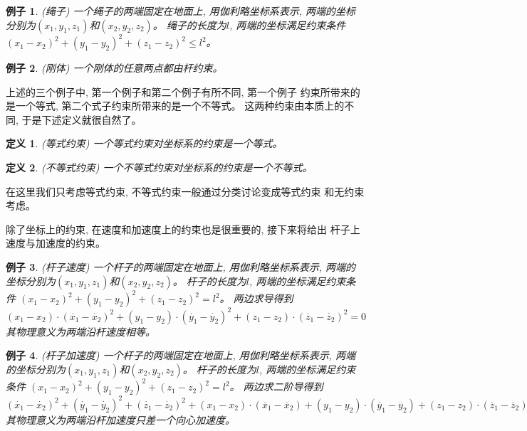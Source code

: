 \documentclass{ctexart}
\numberwithin{equation}{subsection}
\numberwithin{theorem}{subsection}
\newtheorem{definition} {定义}
\numberwithin{definition}{subsection}
\numberwithin{proof}{subsection}
\numberwithin{lemma}{subsection}
\newtheorem{example}    {例子}
\numberwithin{example}{subsection}
\numberwithin{remark}{subsection}
\numberwithin{corollary}{subsection}
\numberwithin{exercise}{subsection}
\numberwithin{problem}{subsection}
\numberwithin{question}{section}
\numberwithin{method}{subsection}
\begin{document}
    \begin{example}
        \label{1.4 ex:rope}
        (绳子) 一个绳子的两端固定在地面上, 用伽利略坐标系表示,
        两端的坐标分别为\((x_1, y_1, z_1)\)和\((x_2, y_2, z_2)\)。
        绳子的长度为\(l\), 两端的坐标满足约束条件
        \((x_1 - x_2)^2 + (y_1 - y_2)^2 + (z_1 - z_2)^2 \leq l^2\)。
    \end{example}

    \begin{example}
        \label{1.4 ex:rigid body}
        (刚体) 一个刚体的任意两点都由杆约束。
    \end{example}

    上述的三个例子中, 第一个例子和第二个例子有所不同, 第一个例子
    约束所带来的是一个等式, 第二个式子约束所带来的是一个不等式。
    这两种约束由本质上的不同, 于是下述定义就很自然了。

    \begin{definition}
        \label{1.4 def:equation constraint}
        (等式约束) 一个等式约束对坐标系的约束是一个等式。
    \end{definition}

    \begin{definition}
        \label{1.4 def:inequality constraint}
        (不等式约束) 一个不等式约束对坐标系的约束是一个不等式。
    \end{definition}

    在这里我们只考虑等式约束, 不等式约束一般通过分类讨论变成等式约束
    和无约束考虑。

    除了坐标上的约束, 在速度和加速度上的约束也是很重要的, 接下来将给出
    杆子上速度与加速度的约束。

    \begin{example}
        \label{1.4 ex:stick velocity}
        (杆子速度) 一个杆子的两端固定在地面上, 用伽利略坐标系表示,
        两端的坐标分别为\((x_1, y_1, z_1)\)和\((x_2, y_2, z_2)\)。
        杆子的长度为\(l\), 两端的坐标满足约束条件
        \((x_1 - x_2)^2 + (y_1 - y_2)^2 + (z_1 - z_2)^2 = l^2\)。
        两边求导得到
        \((x_1 - x_2) \cdot (\dot{x_1} - \dot{x_2})^2 + 
        (y_1 - y_2) \cdot (\dot{y_1} - \dot{y_2})^2 + 
        (z_1 - z_2) \cdot (\dot{z_1} - \dot{z_2})^2 = 0\)
        其物理意义为两端沿杆速度相等。
    \end{example}

    \begin{example}
        \label{1.4 ex:stick acceleration}
        (杆子加速度) 一个杆子的两端固定在地面上, 用伽利略坐标系表示,
        两端的坐标分别为\((x_1, y_1, z_1)\)和\((x_2, y_2, z_2)\)。
        杆子的长度为\(l\), 两端的坐标满足约束条件
        \((x_1 - x_2)^2 + (y_1 - y_2)^2 + (z_1 - z_2)^2 = l^2\)。
        两边求二阶导得到
        \((\dot{x_1} - \dot{x_2})^2 + 
        (\dot{y_1} - \dot{y_2})^2 + 
        (\dot{z_1} - \dot{z_2})^2 + 
        (x_1 - x_2) \cdot (\ddot{x_1} - \ddot{x_2}) +
        (y_1 - y_2) \cdot (\ddot{y_1} - \ddot{y_2}) +
        (z_1 - z_2) \cdot (\ddot{z_1} - \ddot{z_2}) = 0
        \)
        其物理意义为两端沿杆加速度只差一个向心加速度。
    \end{example}
\end{document}
